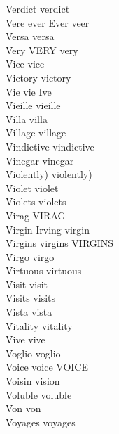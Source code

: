 Verdict verdict\\
Vere ever Ever veer\\
Versa versa\\
Very VERY very\\
Vice vice\\
Victory victory\\
Vie vie Ive\\
Vieille vieille\\
Villa villa\\
Village village\\
Vindictive vindictive\\
Vinegar vinegar\\
Violently) violently)\\
Violet violet\\
Violets violets\\
Virag VIRAG\\
Virgin Irving virgin\\
Virgins virgins VIRGINS\\
Virgo virgo\\
Virtuous virtuous\\
Visit visit\\
Visits visits\\
Vista vista\\
Vitality vitality\\
Vive vive\\
Voglio voglio\\
Voice voice VOICE\\
Voisin vision\\
Voluble voluble\\
Von von\\
Voyages voyages\\

